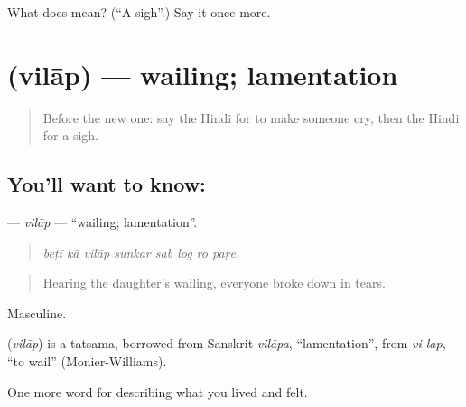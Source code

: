 \begin{tcolorbox}[breakable,colback=teal!4,colframe=teal!35!black,title={Before you move on}]
What does  mean? (\textquotedblleft{}A sigh\textquotedblright{}.) Say it once more.
\end{tcolorbox}
\section[\texorpdfstring{\hi{विलाप} (vilāp)}{विलाप (vilāp)}]{ (vilāp) — wailing; lamentation}

\label{lesson:HI-C465-vilap}



\begin{quote}
Before the new one: say the Hindi for to make someone cry, then the Hindi for a sigh.
\end{quote}

\subsection*{You'll want to know: }
\textbf{} — \emph{vilāp} — \textquotedblleft{}wailing; lamentation\textquotedblright{}.

\begin{quote}
       
\end{quote}

\begin{quote}
\emph{beṭī kā vilāp sunkar sab log ro paṛe.}
\end{quote}

\begin{quote}
Hearing the daughter's wailing, everyone broke down in tears.
\end{quote}

Masculine.

\begin{cousinweb}
\textbf{} (\emph{vilāp}) is a tatsama, borrowed from Sanskrit \emph{vilāpa}, \textquotedblleft{}lamentation\textquotedblright{}, from \emph{vi-lap}, \textquotedblleft{}to wail\textquotedblright{} (Monier-Williams).
\end{cousinweb}

\begin{grammarlens}[title={What you've built}]
One more word for describing what you lived and felt.
\end{grammarlens}

